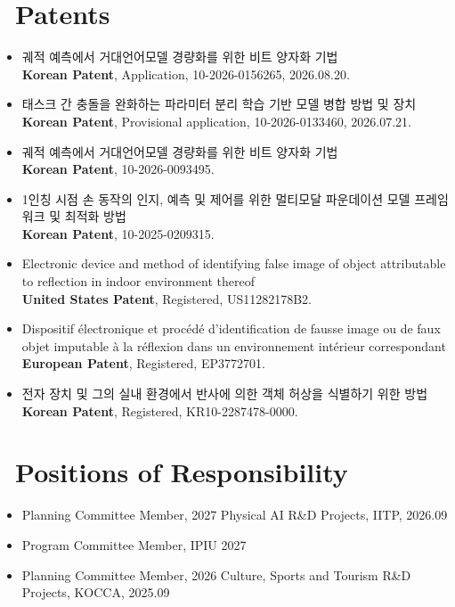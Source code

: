\documentclass[a4paper,11pt]{article}
\begin{document}
\section{\faFileSignature\ Patents}
\begin{itemize}[leftmargin=0.25cm]


    \item
    궤적 예측에서 거대언어모델 경량화를 위한 비트 양자화 기법\\
    \textbf{Korean Patent}, Application, 10-2026-0156265, 2026.08.20.

    \item
    태스크 간 충돌을 완화하는 파라미터 분리 학습 기반 모델 병합 방법 및 장치\\
    \textbf{Korean Patent}, Provisional application, 10-2026-0133460, 2026.07.21.

    \item
    궤적 예측에서 거대언어모델 경량화를 위한 비트 양자화 기법\\
    \textbf{Korean Patent}, 10-2026-0093495.
    
    \item
    1인칭 시점 손 동작의 인지, 예측 및 제어를 위한 멀티모달 파운데이션 모델 프레임워크 및 최적화 방법\\
    \textbf{Korean Patent}, 10-2025-0209315.
    
    \item
    Electronic device and method of identifying false image of object attributable to reflection in indoor environment thereof\\
    \textbf{United States Patent}, Registered, US11282178B2.

    \item 
    Dispositif électronique et procédé d'identification de fausse image ou de faux objet imputable à la réflexion dans un environnement intérieur correspondant\\
    \textbf{European Patent}, Registered, EP3772701.

    \item
    전자 장치 및 그의 실내 환경에서 반사에 의한 객체 허상을 식별하기 위한 방법\\
    \textbf{Korean Patent}, Registered, KR10-2287478-0000.

\end{itemize}

\section{\faUserTie\ Positions of Responsibility}
\begin{itemize}[leftmargin=0.25cm]
    \item Planning Committee Member, 2027 Physical AI R\&D Projects, IITP, 2026.09
    \item Program Committee Member, IPIU 2027
    \item Planning Committee Member, 2026 Culture, Sports and Tourism R\&D Projects, KOCCA, 2025.09
\end{itemize} 
\end{document}
